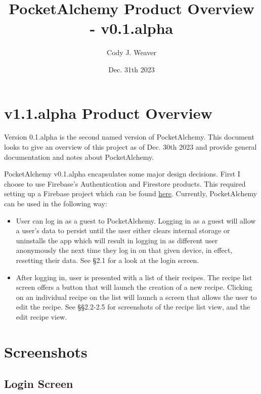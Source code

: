\documentclass[12pt]{article}
\begin{document}
\title{PocketAlchemy Product Overview - v0.1.alpha}
\author{Cody J. Weaver}
\date{Dec. 31th 2023}
\maketitle

\section{v1.1.alpha Product Overview}

\indent Version 0.1.alpha is the second named version of PocketAlchemy.
This document looks to give an overview of this project as of 
Dec. 30th 2023 and provide general documentation and notes 
about PocketAlchemy.


PocketAlchemy v0.1.alpha encapsulates some major design decisions.
First I choose to use Firebase's Authentication and Firestore products.
This required setting up a Firebase project which can be found 
\href{https://console.firebase.google.com/u/0/project/pocketalchemy-c2355/overview}
{here}. Currently, PocketAlchemy can be used in the following way:


\begin{itemize}
    \item User can log in as a guest to PocketAlchemy. Logging in
    as a guest will allow a user's data to persist until the user
    either clears internal storage or uninstalls the app which will result in logging in as 
    different user anonymously the next time they 
    log in on that given device, in effect, resetting their data.
    See \S\@ 2.1 for a look at the login screen.

    \item After logging in, user is presented with a list of their recipes.
    The recipe list screen offers a button that will launch the creation of 
    a new recipe. Clicking on an individual recipe on the list will launch 
    a screen that allows the user to edit the recipe. See \S\S\@ 2.2-2.5 for 
    screenshots of the recipe list view, and the edit recipe view.
    
\end{itemize}




\section{Screenshots}
\subsection{Login Screen}
\end{document}
